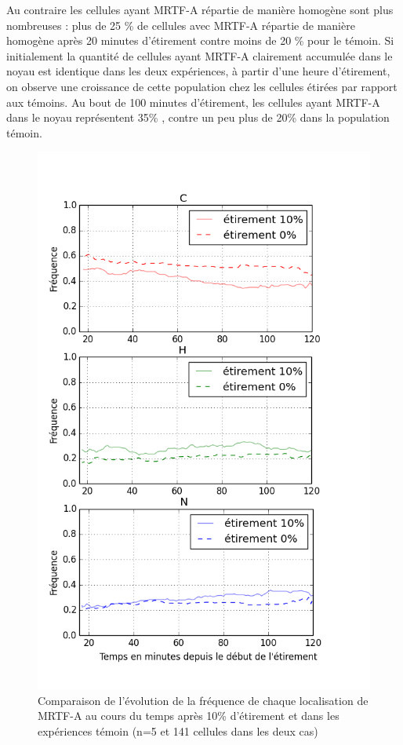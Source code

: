 Au contraire les cellules ayant MRTF-A répartie de manière homogène sont plus nombreuses : plus de 25 \% de cellules avec MRTF-A répartie de manière homogène après 20 minutes d'étirement contre moins de 20  \% pour le témoin. 
Si initialement la quantité de cellules ayant MRTF-A clairement accumulée dans le noyau est identique dans les deux expériences, à partir d'une heure d'étirement, on observe une croissance de cette population chez les cellules étirées par rapport aux témoins. Au bout de 100 minutes d'étirement, les cellules ayant MRTF-A dans le noyau représentent 35\% , contre un peu plus de 20\% dans la population témoin. 



\begin{figure}
\includegraphics[scale=0.4]{Figures/Etirement10_vs_0_dynamique.png} 
\caption{\label{CHN_dyn_Et10} Comparaison de l'évolution de la fréquence de chaque localisation de MRTF-A au cours du temps après 10\% d'étirement et dans les expériences témoin (n=5 et 141 cellules dans les deux cas)}
\end{figure}

